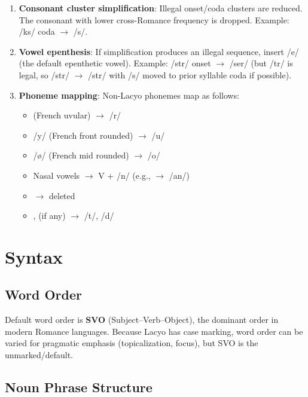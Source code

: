 \documentclass[12pt]{book}
\begin{document}
\begin{enumerate}
  \item \textbf{Consonant cluster simplification}: Illegal onset/coda clusters
        are reduced. The consonant with lower cross-Romance frequency is dropped.
        Example: /ks/ coda $\to$ /s/.
  \item \textbf{Vowel epenthesis}: If simplification produces an illegal sequence,
        insert /e/ (the default epenthetic vowel). Example: /str/ onset $\to$
        /ser/ (but /tr/ is legal, so /str/ $\to$ /str/ with /s/ moved to
        prior syllable coda if possible).
  \item \textbf{Phoneme mapping}: Non-Lacyo phonemes map as follows:
        \begin{itemize}
          \item {} (French uvular) $\to$ /r/
          \item /y/ (French front rounded) $\to$ /u/
          \item /\o{}/ (French mid rounded) $\to$ /o/
          \item Nasal vowels $\to$ V + /n/ (e.g.,  $\to$ /an/)
          \item \textipa{/\textglotstop/} $\to$ deleted
          \item {},  (if any) $\to$ /t/, /d/
        \end{itemize}
\end{enumerate}


\chapter{Syntax}
\label{ch:syntax}

\section{Word Order}

Default word order is \textbf{SVO} (Subject--Verb--Object), the dominant
order in modern Romance languages. Because Lacyo has case marking, word
order can be varied for pragmatic emphasis (topicalization, focus), but
SVO is the unmarked/default.

\section{Noun Phrase Structure}
\end{document}
